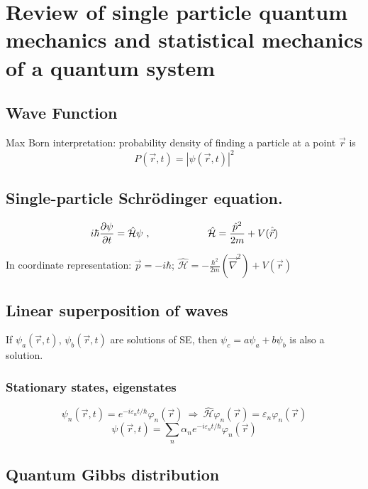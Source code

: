 \documentclass[10pt]{article}
\date{\today}
\newcommand{\Ham}{\hat{\mathcal{H}}}
\renewcommand{\grad}{\vec \nabla}
\newcommand{\smallspace}{\hspace{2cm}}
\begin{document}
\section{Review of single particle quantum mechanics and statistical mechanics of a quantum system}

\subsection{Wave Function}
Max Born interpretation: probability density of finding a particle at a point $\vec r$ is
$$
P(\vec r, t) = \left|\psi(\vec r, t)\right|^2
$$
\subsection{Single-particle Schr\"odinger equation.}

$$
i\hbar \pdv{\psi}{t} = \Ham \psi \ , \smallspace \Ham = \frac{\hat p^2}{2m} + V(\hat{\vec r})
$$

In coordinate representation: $\vec p = -i\hbar $; $\Ham = -\frac{\hbar^2}{2m}(\grad^2)+V(\vec r)$
\subsection{Linear superposition of waves}
If $\psi_a(\vec r, t)$, $\psi_b(\vec r, t)$ are solutions of SE, then $\psi_c =  a\psi_a + b\psi_b$ is also a solution.

\subsubsection{Stationary states, eigenstates}
$$
\psi_n(\vec r, t) = e^{-i\varepsilon_n t/\hbar}\varphi_n(\vec r) \ \Rightarrow \ \Ham \varphi_n(\vec r) = \varepsilon_n \varphi_n(\vec r)
$$
$$
\psi(\vec r, t) = \sum_n \alpha_n e^{-i\varepsilon_n t/\hbar} \varphi_n(\vec r)
$$

\subsection{Quantum Gibbs distribution}
\end{document}
